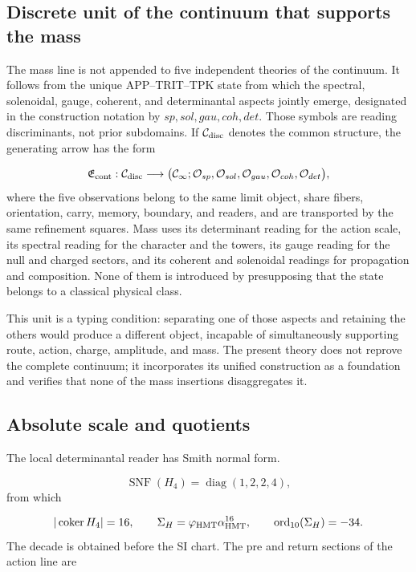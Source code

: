 \subsection{Discrete unit of the continuum that supports the mass}
The mass line is not appended to five independent theories of the continuum. It follows from the unique APP--TRIT--TPK state from which the spectral, solenoidal, gauge, coherent, and determinantal aspects jointly emerge, designated in the construction notation by \(sp,sol,gau,coh,det\). Those symbols are reading discriminants, not prior subdomains. If \(\mathcal C_{\rm disc}\) denotes the common structure, the generating arrow has the form

\[
\mathfrak E_{\rm cont}:\mathcal C_{\rm disc}
\longrightarrow
\bigl(\mathcal C_\infty;
\mathcal O_{sp},\mathcal O_{sol},\mathcal O_{gau},
\mathcal O_{coh},\mathcal O_{det}\bigr),
\]
where the five observations belong to the same limit object, share fibers, orientation, carry, memory, boundary, and readers, and are transported by the same refinement squares. Mass uses its determinant reading for the action scale, its spectral reading for the character and the towers, its gauge reading for the null and charged sectors, and its coherent and solenoidal readings for propagation and composition. None of them is introduced by presupposing that the state belongs to a classical physical class.

This unit is a typing condition: separating one of those aspects and retaining the others would produce a different object, incapable of simultaneously supporting route, action, charge, amplitude, and mass. The present theory does not reprove the complete continuum; it incorporates its unified construction as a foundation and verifies that none of the mass insertions disaggregates it.

\subsection{Absolute scale and quotients}
The local determinantal reader has Smith normal form.

\[
\operatorname{SNF}(H_4)=\operatorname{diag}(1,2,2,4),
\]
from which

\[
|\operatorname{coker}H_4|=16,
\qquad
\Sigma_H=\varphi_{\rm HMT}\alpha_{\rm HMT}^{16},
\qquad
\operatorname{ord}_{10}(\Sigma_H)=-34.
\]
The decade is obtained before the SI chart. The pre and return sections of the action line are

